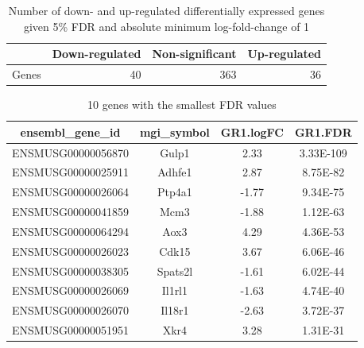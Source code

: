 \documentclass[12pt]{article}
\begin{document}
\begin{table}[ht]
\centering
\begin{tabular}{rrrr}
  \hline
 & Down-regulated & Non-significant & Up-regulated \\ 
  \hline
Genes & 40 & 363 & 36 \\ 
   \hline
\end{tabular}
\caption{Number of down- and up-regulated differentially expressed genes given 5\% FDR and absolute minimum log-fold-change of 1 } 
\end{table}%
\begin{table}[H]
\centering
{\footnotesize
\begin{tabular}{cccc}
  \hline
ensembl\_gene\_id & mgi\_symbol & GR1.logFC & GR1.FDR \\ 
  \hline
ENSMUSG00000056870 & Gulp1 & 2.33 & 3.33E-109 \\ 
  ENSMUSG00000025911 & Adhfe1 & 2.87 & 8.75E-82 \\ 
  ENSMUSG00000026064 & Ptp4a1 & -1.77 & 9.34E-75 \\ 
  ENSMUSG00000041859 & Mcm3 & -1.88 & 1.12E-63 \\ 
  ENSMUSG00000064294 & Aox3 & 4.29 & 4.36E-53 \\ 
  ENSMUSG00000026023 & Cdk15 & 3.67 & 6.06E-46 \\ 
  ENSMUSG00000038305 & Spats2l & -1.61 & 6.02E-44 \\ 
  ENSMUSG00000026069 & Il1rl1 & -1.63 & 4.74E-40 \\ 
  ENSMUSG00000026070 & Il18r1 & -2.63 & 3.72E-37 \\ 
  ENSMUSG00000051951 & Xkr4 & 3.28 & 1.31E-31 \\ 
   \hline
\end{tabular}
}
\caption{10 genes with the smallest FDR values} 
\end{table}
\end{document}
